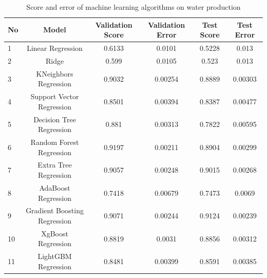 \documentclass[12pt,a4paper]{report}
\begin{document}
\begin{table}[H]
\caption{Score and error of machine learning algorithms on water production}
\centering
\begin{adjustbox}{width=1\textwidth}
\small
\begin{tabular}{|l|c|c|c|c|c|}
\hline
\textbf{No} & \textbf{Model}               & \textbf{Validation Score} & \textbf{Validation Error} & \textbf{Test Score} & \textbf{Test Error} \\ \hline
1           & Linear Regression            & 0.6133                    & 0.0101                    & 0.5228              & 0.013               \\ \hline
2           & Ridge                        & 0.599                     & 0.0105                    & 0.523               & 0.013               \\ \hline
3           & KNeighbors Regression        & 0.9032                    & 0.00254                   & 0.8889              & 0.00303             \\ \hline
4           & Support Vector Regression    & 0.8501                    & 0.00394                   & 0.8387              & 0.00477             \\ \hline
5           & Decision Tree Regression     & 0.881                     & 0.00313                   & 0.7822              & 0.00595             \\ \hline
6           & Random Forest Regression     & 0.9197                    & 0.00211                   & 0.8904              & 0.00299             \\ \hline
7           & Extra Tree Regression        & 0.9057                    & 0.00248                   & 0.9015              & 0.00268             \\ \hline
8           & AdaBoost Regression          & 0.7418                    & 0.00679                   & 0.7473              & 0.0069              \\ \hline
9           & Gradient Boosting Regression & 0.9071                    & 0.00244                   & 0.9124              & 0.00239             \\ \hline
10          & XgBoost Regression           & 0.8819                    & 0.0031                    & 0.8856              & 0.00312             \\ \hline
11          & LightGBM Regression          & 0.8481                    & 0.00399                   & 0.8591              & 0.00385             \\ \hline
\end{tabular}
\end{adjustbox}
\end{table}
\end{document}
